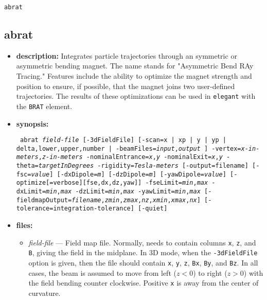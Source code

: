 \documentclass[11pt]{article}
\begin{document}
\newpage
\begin{center}{\Large\verb|abrat|}\end{center}
\subsection{abrat}

\begin{itemize}
\item {\bf description:}  Integrates particle trajectories through an symmetric or asymmetric bending magnet.
The name stands for "Asymmetric Bend RAy Tracing."
Features include the ability to optimize the magnet strength and position to ensure, if possible, that the
magnet joins two user-defined trajectories.
The results of these optimizations can be used in {\tt elegant} with the \verb|BRAT| element.

\item {\bf synopsis:}
\begin{flushleft}{\tt
abrat {\em field-file} [-3dFieldFile] 
 [{-scan={x | xp | y | yp | delta},lower,upper,number | -beamFiles={\em input},{\em output} }]
 -vertex={\em x-in-meters},{\em z-in-meters} -nominalEntrance={\em x},{\em y} -nominalExit={\em x},{\em y}
 -theta={\em targetInDegrees} -rigidity={\em Tesla-meters}
 [-output=filename] [-fsc={\em value}] [-dxDipole={\em m}] [-dzDipole={\em m}] [-yawDipole={\em value}]
 {[-optimize[=verbose][{fse,dx,dz,yaw}]]
  -fseLimit={\em min},{\em max} -dxLimit={\em min},{\em max} -dzLimit={\em min},{\em max} -yawLimit={\em min},{\em max}}
 [-fieldmapOutput={\em filename},{\em zmin},{\em zmax},{\em nz},{\em xmin},{\em xmax},{\em nx}]
 [-tolerance=integration-tolerance]
 [-quiet]
}\end{flushleft}

\item {\bf files:}
\begin{itemize}
\item {\em field-file} --- Field map file. Normally, needs to contain columns \verb|x|, \verb|z|, and \verb|B|, giving the 
field in the midplane. In 3D mode, when the \verb|-3dFieldFile| option is given, then the file should contain
\verb|x|, \verb|y|, \verb|z|, \verb|Bx|, \verb|By|, and \verb|Bz|. 
In all cases, the beam is assumed to move from left ($z<0$) to right ($z>0$) with the field bending counter clockwise.
Positive \verb|x| is away from the center of curvature.
\end{itemize}


\end{itemize}
\end{document}
